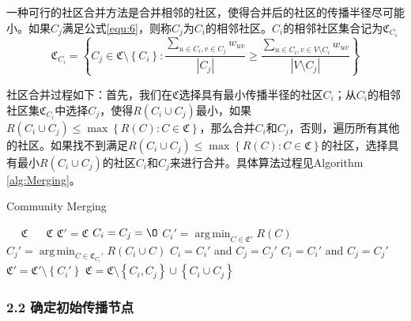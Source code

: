 \documentclass[UTF8]{ctexart}
\DeclareMathOperator*{\argmin}{arg\,min}
\begin{document}
\par 一种可行的社区合并方法是合并相邻的社区，使得合并后的社区的传播半径尽可能小。如果$C_j$满足公式\eqref{equ:6}，则称$C_j$为$C_i$的相邻社区。$C_i$的相邻社区集合记为$\mathfrak{C}_{C_i}$
\begin{equation}\mathfrak{C}_{C_i} = \left \{ C_j \in \mathfrak{C} \setminus \left \{ C_i \right \}:\frac {\sum_{u \in C_i,v\in C_j} w_{uv} } {\left | C_{j} \right | } \geq 
\frac {\sum_{u \in C_i,v\in V \setminus C_i} w_{uv} } {\left | V \setminus C_{j} \right | } \right \}\label{equ:6}\end{equation}

\par 社区合并过程如下：首先，我们在$\mathfrak{C}$选择具有最小传播半径的社区$C_i$；从$C_i$的相邻社区集$\mathfrak{C}_{C_i}$中选择$C_j$，使得$R(C_i \cup C_j)$最小，如果$R(C_i \cup C_j) \leq \max\left \{ R(C):C\in \mathfrak{C} \right \}$，那么合并$C_i$和$C_j$，否则，遍历所有其他的社区。如果找不到满足$R(C_i \cup C_j) \leq \max\left \{ R(C):C\in \mathfrak{C} \right \}$的社区，选择具有最小$R(C_i \cup C_j)$的社区$C_i$和$C_j$来进行合并。具体算法过程见Algorithm \ref{alg:Merging}。
\begin{algorithm}[htb]   
\caption{ Community Merging}   
\label{alg:Merging}   
\begin{algorithmic}[1] %
\REQUIRE ~~ %
$\mathfrak{C}$ 
\ENSURE ~~ %
$\mathfrak{C}$
\label{ code:fram:extract }%
\STATE $\mathfrak{C}' = \mathfrak{C}$
\STATE $C_i=C_j=\O $
\STATE $C_{i}' = \argmin_{C \in \mathfrak{C}'}R( C)$
\STATE $C_{j}' = \argmin_{C \in \mathfrak{C}_{C_i}'}R(C_i \cup C)$
\STATE $C_{i} = C_{i}'$ and $C_j = C_{j}'$ 
\PRINT
\ELSE
{}
\STATE $C_{i} = C_{i}'$ and $C_j = C_{j}'$ 
\ENDIF
\STATE $\mathfrak{C}' = \mathfrak{C}' \setminus \left \{ C_{i}' \right \}$
\ENDIF
\ENDWHILE
\STATE $\mathfrak{C} = \mathfrak{C} \setminus \left \{ C_i,C_j\right \} \cup \left \{ C_i \cup C_j\right \}$
\ENDWHILE 
\end{algorithmic}  
\end{algorithm}   

\subsubsection*{2.2 确定初始传播节点}
\end{document}
